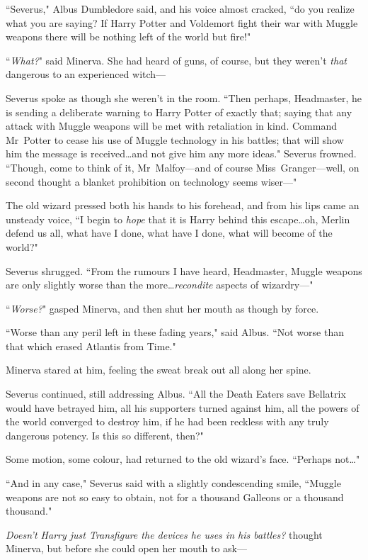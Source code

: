``Severus," Albus Dumbledore said, and his voice almost cracked, ``do you realize what you are saying? If Harry Potter and Voldemort fight their war with Muggle weapons there will be nothing left of the world but fire!"

``\emph{What?}" said Minerva. She had heard of guns, of course, but they weren't \emph{that} dangerous to an experienced witch—

Severus spoke as though she weren't in the room. ``Then perhaps, Headmaster, he is sending a deliberate warning to Harry Potter of exactly that; saying that any attack with Muggle weapons will be met with retaliation in kind. Command Mr~Potter to cease his use of Muggle technology in his battles; that will show him the message is received…and not give him any more ideas." Severus frowned. ``Though, come to think of it, Mr~Malfoy—and of course Miss~Granger—well, on second thought a blanket prohibition on technology seems wiser—"

The old wizard pressed both his hands to his forehead, and from his lips came an unsteady voice, ``I begin to \emph{hope} that it is Harry behind this escape…oh, Merlin defend us all, what have I done, what have I done, what will become of the world?"

Severus shrugged. ``From the rumours I have heard, Headmaster, Muggle weapons are only slightly worse than the more…\emph{recondite} aspects of wizardry—"

``\emph{Worse?}" gasped Minerva, and then shut her mouth as though by force.

``Worse than any peril left in these fading years," said Albus. ``Not worse than that which erased Atlantis from Time."

Minerva stared at him, feeling the sweat break out all along her spine.

Severus continued, still addressing Albus. ``All the Death Eaters save Bellatrix would have betrayed him, all his supporters turned against him, all the powers of the world converged to destroy him, if he had been reckless with any truly dangerous potency. Is this so different, then?"

Some motion, some colour, had returned to the old wizard's face. ``Perhaps not…"

``And in any case," Severus said with a slightly condescending smile, ``Muggle weapons are not so easy to obtain, not for a thousand Galleons or a thousand thousand."

\emph{Doesn't Harry just Transfigure the devices he uses in his battles?} thought Minerva, but before she could open her mouth to ask—

